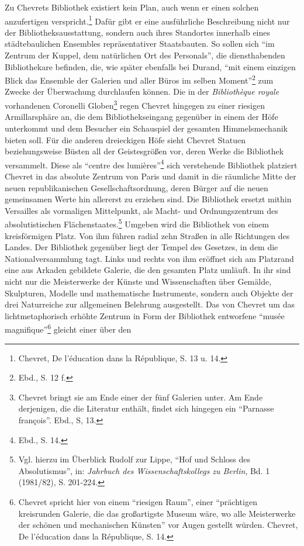 Zu Chevrets Bibliothek existiert kein Plan, auch wenn er einen solchen
anzufertigen verspricht.\footnote{Chevret, De l'éducation dans la
  République, S. 13 u. 14.} Dafür gibt er eine ausführliche Beschreibung
nicht nur der Bibliotheksausstattung, sondern auch ihres Standortes
innerhalb eines städtebaulichen Ensembles repräsentativer Staatsbauten.
So sollen sich \enquote{im Zentrum der Kuppel, dem natürlichen Ort des
Personals}, die diensthabenden Bibliothekare befinden, die, wie später
ebenfalls bei Durand, \enquote{mit einem einzigen Blick das Ensemble der
Galerien und aller Büros im selben Moment}\footnote{Ebd., S. 12 f.} zum
Zwecke der Überwachung durchlaufen können. Die in der \emph{Bibliothèque
royale} vorhandenen Coronelli Globen\footnote{Chevret bringt sie am Ende
  einer der fünf Galerien unter. Am Ende derjenigen, die die Literatur
  enthält, findet sich hingegen ein \enquote{Parnasse françois}. Ebd.,
  S, 13.} regen Chevret hingegen zu einer riesigen Armillarsphäre an,
die dem Bibliothekseingang gegenüber in einem der Höfe unterkommt und
dem Besucher ein Schauspiel der gesamten Himmelsmechanik bieten soll.
Für die anderen dreieckigen Höfe sieht Chevret Statuen beziehungsweise
Büsten all der Geistesgrößen vor, deren Werke die Bibliothek versammelt.
Diese als \enquote{centre des lumières}\footnote{Ebd., S. 14.} sich
verstehende Bibliothek platziert Chevret in das absolute Zentrum von
Paris und damit in die räumliche Mitte der neuen republikanischen
Gesellschaftsordnung, deren Bürger auf die neuen gemeinsamen Werte hin
allererst zu erziehen sind. Die Bibliothek ersetzt mithin Versailles als
vormaligen Mittelpunkt, als Macht- und Ordnungszentrum des
absolutistischen Flächenstaates.\footnote{Vgl. hierzu im Überblick
  Rudolf zur Lippe, \enquote{Hof und Schloss des Absolutismus}, in:
  \emph{Jahrbuch des Wissenschaftskollegs} \emph{zu Berlin}, Bd. 1
  (1981/82), S. 201-224.} Umgeben wird die Bibliothek von einem
kreisförmigen Platz. Von ihm führen radial zehn Straßen in alle
Richtungen des Landes. Der Bibliothek gegenüber liegt der Tempel des
Gesetzes, in dem die Nationalversammlung tagt. Links und rechts von ihm
eröffnet sich am Platzrand eine aus Arkaden gebildete Galerie, die den
gesamten Platz umläuft. In ihr sind nicht nur die Meisterwerke der
Künste und Wissenschaften über Gemälde, Skulpturen, Modelle und
mathematische Instrumente, sondern auch Objekte der drei Naturreiche zur
allgemeinen Belehrung ausgestellt. Das von Chevret um das
lichtmetaphorisch erhöhte Zentrum in Form der Bibliothek entworfene
\enquote{musée magnifique}\footnote{Chevret spricht hier von einem
  \enquote{riesigen Raum}, einer \enquote{prächtigen kreisrunden
  Galerie, die das großartigste Museum wäre, wo alle Meisterwerke der
  schönen und mechanischen Künsten} vor Augen gestellt würden. Chevret,
  De l'éducation dans la République, S. 14.} gleicht einer über den

